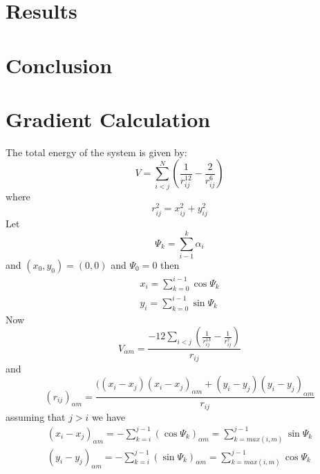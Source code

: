 \documentclass[conference,letterpaper]{IEEEtran}
\begin{document}
\section{Results}


\section{Conclusion}

\clearpage



\clearpage

%
%
\appendices
\section{Gradient Calculation}
The total energy of the system is given by:
\begin{equation}
    V = \sum_{i<j}^{N}(\frac{1}{r_{ij}^{12}} - \frac{2}{r_{ij}^{6}})
\end{equation}
where
\begin{equation}
    r^{2}_{ij} = x^{2}_{ij} + y^{2}_{ij}
\end{equation}
Let
\begin{equation}
    \Psi_{k}=\sum_{i-1}^{k}\alpha_{i}
\end{equation}
and $(x_{0}, y_{0})=(0,0)$ and $\Psi_{0}=0$ then
\begin{equation}
    \begin{split}
        x_{i} = \sum_{k=0}^{i-1}\cos{\Psi_{k}} \\
        y_{i} = \sum_{k=0}^{i-1}\sin{\Psi_{k}}
    \end{split}
\end{equation}
Now
\begin{equation}
    V_{\alpha m} = \frac{-12 \sum_{i < j} (\frac{1}{r_{ij}^{13}} - \frac{1}{r_{ij}^{7}})}{r_{ij}}
\end{equation}
and
\begin{equation}
    (r_{ij})_{\alpha m} = \frac{((x_{i} - x_{j})(x_{i} - x_{j})_{\alpha m} + (y_{i} - y_{j})(y_{i} - y_{j})_{\alpha m}}{r_{ij}}
\end{equation}
assuming that $j > i$ we have
\begin{equation}
    \begin{split}
        (x_{i} - x_{j})_{\alpha m} = -\sum_{k=i}^{j-1}(\cos{\Psi_{k}})_{\alpha m} = \sum_{k=max(i,m)}^{j-1} \sin{\Psi_{k}} \\
        (y_{i} - y_{j})_{\alpha m} = -\sum_{k=i}^{j-1}(\sin{\Psi_{k}})_{\alpha m} = \sum_{k=max(i,m)}^{j-1} \cos{\Psi_{k}}
    \end{split}
\end{equation}
\end{document}
